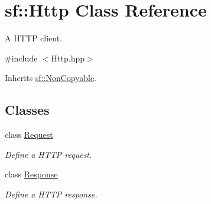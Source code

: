 \hypertarget{classsf_1_1_http}{\section{sf\+:\+:Http Class Reference}
\label{classsf_1_1_http}
}


A H\+T\+T\+P client.  




{\ttfamily \#include $<$Http.\+hpp$>$}



Inherits \hyperlink{classsf_1_1_non_copyable}{sf\+::\+Non\+Copyable}.

\subsection*{Classes}
\begin{DoxyCompactItemize}
\item 
class \hyperlink{classsf_1_1_http_1_1_request}{Request}
\begin{DoxyCompactList}\small\item\em Define a H\+T\+T\+P request. \end{DoxyCompactList}\item 
class \hyperlink{classsf_1_1_http_1_1_response}{Response}
\begin{DoxyCompactList}\small\item\em Define a H\+T\+T\+P response. \end{DoxyCompactList}\end{DoxyCompactItemize}
